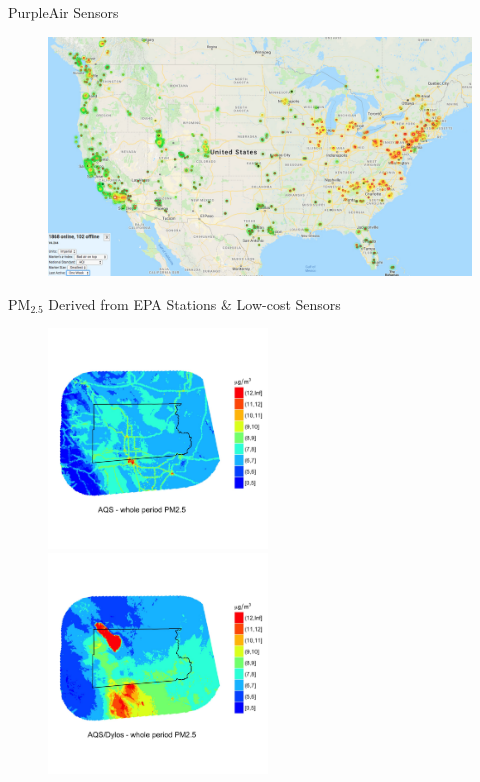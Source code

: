 \documentclass[handout]{beamer} %
\begin{document}
\begin{frame}{PurpleAir Sensors}
    \begin{figure}
        \centering
        \includegraphics[width=\textwidth]{img/appendix/Stations/purpleair.jpg}
    \end{figure}
\end{frame}

\begin{frame}{PM$_{2.5}$ Derived from EPA Stations \& Low-cost Sensors}
    \begin{figure}
        \centering
        \includegraphics[width=0.52\textwidth]{img/appendix/aqs.jpg}
        \includegraphics[width=0.52\textwidth]{img/appendix/aqs_dylos.jpg}
        \label{fig:lowcost}
    \end{figure}
\end{frame}
\end{document}
